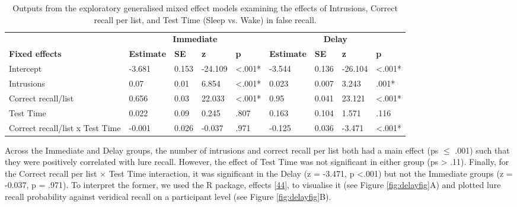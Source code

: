 \documentclass[
]{article}
\begin{document}
\begin{table}[H]

\caption{\label{tab:table7}Outputs from the exploratory generalised mixed effect models examining the effects of Intrusions, Correct recall per list, and Test Time (Sleep vs. Wake) in false recall.}
\centering
\begin{tabular}[t]{lllllllll}
\toprule
\multicolumn{1}{c}{\textbf{}} & \multicolumn{4}{c}{\textbf{Immediate}} & \multicolumn{4}{c}{\textbf{Delay}} \\
\cmidrule(l{3pt}r{3pt}){2-5} \cmidrule(l{3pt}r{3pt}){6-9}
\textbf{Fixed effects} & \textbf{Estimate} & \textbf{SE} & \textbf{z} & \textbf{p} & \textbf{Estimate} & \textbf{SE} & \textbf{z} & \textbf{p}\\
\midrule
Intercept & -3.681 & 0.153 & -24.109 & <.001* & -3.544 & 0.136 & -26.104 & <.001*\\
Intrusions & 0.07 & 0.01 & 6.854 & <.001* & 0.023 & 0.007 & 3.243 & .001*\\
Correct recall/list & 0.656 & 0.03 & 22.033 & <.001* & 0.95 & 0.041 & 23.121 & <.001*\\
Test Time & 0.022 & 0.09 & 0.245 & .807 & 0.163 & 0.104 & 1.571 & .116\\
Correct recall/list x Test Time & -0.001 & 0.026 & -0.037 & .971 & -0.125 & 0.036 & -3.471 & <.001*\\
\bottomrule
\end{tabular}
\end{table}

Across the Immediate and Delay groups, the number of intrusions and correct recall per list both had a main effect (ps \(\leq\) .001) such that they were positively correlated with lure recall. However, the effect of Test Time was not significant in either group (ps \textgreater{} .11). Finally, for the Correct recall per list \(\times\) Test Time interaction, it was significant in the Delay (z = -3.471, p \textless.001) but not the Immediate groups (z = -0.037, p = .971). To interpret the former, we used the R package, effects {[}\protect\hyperlink{ref-fox2019a}{44}{]}, to visualise it (see Figure \ref{fig:delayfig}A) and plotted lure recall probability against veridical recall on a participant level (see Figure \ref{fig:delayfig}B).
\end{document}
